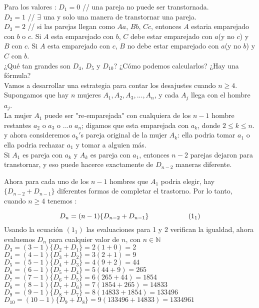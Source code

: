\documentclass[11pt,a4paper]{article}
\begin{document}
Para los valores :\newline
$D_{1} = 0$ \hspace*{0.5cm} // una pareja no puede ser transtornada.\\
$D_{2} = 1$ \hspace*{0.5cm} // $\exists$ una y solo una manera de transtornar una pareja.\\ 
$D_{3} = 2$ \hspace*{0.5cm} // si las parejas llegan como $Aa$, $Bb$, $Cc$, entonces $A$ estaria emparejado con $b$ o $c$. Si $A$ esta emparejado con $b$, $C$ debe estar emparejado con $a$(y no $c$) y $B$ con $c$. Si $A$ esta emparejado con $c$, $B$ no debe estar emparejado con $a$(y no $b$) y $C$ con $b$.\\ \newline
¿Qué tan grandes son $D_{4}$, $D_{5}$ y $D_{10}$? ¿Cómo podemos calcularlos? ¿Hay una fórmula?\\

Vamos a desarrollar una estrategia para contar los desajustes cuando $n \geq 4$. Supongamos que hay $n$ mujeres $A_{1}, A_{2}, A_{3},...,A_{n}$, y cada $A_{j}$ llega con el hombre $a_{j}$.\\

La mujer $A_{1}$ puede ser "re-emparejada" con cualquiera de los $n-1$ hombre restantes $a_{2}$ o $a_{3}$ o ...o $a_{n}$; digamos que esta emparejada con $a_{k}$, donde $2\leq k \leq n.$ y ahora consideremos $a_{k}'$s pareja original de la mujer $A_{k}$: ella podria tomar $a_{1}$ o ella podria rechazar $a_{1}$ y tomar a alguien más.\\

Si $A_{1}$ es pareja con $a_{k}$ y $A_{k}$ es pareja con $a_{1}$, entonces $n-2$ parejas dejaron para transtornar, y eso puede hacerce exactamente de $D_{n-2}$ maneras diferente.

Ahora para cada uno de los $n-1$ hombres que $A_{1}$ podria elegir, hay $\{D_{n-2}+ D_{n-1}\}$ diferentes formas de completar el trastorno. Por lo tanto, cuando $n \geq 4$ tenemos :


$$ D_{n} = (n-1)\{ D_{n-2} + D_{n-1}\} \hspace*{2cm} (1_1) $$ 
Usando la ecuación $(1_1)$ las evaluaciones para 1 y 2 verifican la igualdad, ahora evaluemos $D_{n}$ para cualquier valor de $n$, con $n \in \mathbb{N}$\\ \newline
$D_{3} = (3 - 1)\{D_{2} + D_{1}\} = 2(1 + 0) = 2$\\
$D_{4} = (4 - 1)\{D_{3} + D_{2}\} = 3(2 + 1) = 9$\\
$D_{5} = (5 - 1)\{D_{4} + D_{3}\} = 4(9 + 2) = 44$\\
$D_{6} = (6 - 1)\{D_{5} + D_{4}\} = 5(44 + 9) = 265$\\
$D_{7} = (7 - 1)\{D_{6} + D_{5}\} = 6(265 + 44) = 1854$\\
$D_{8} = (8 - 1)\{D_{7} + D_{6}\} = 7(1854 + 265) = 14833$\\
$D_{9} = (9 - 1)\{D_{8} + D_{7}\} = 8(14833 + 1854) = 133496$\\
$D_{10}= (10 - 1)\{D_{9} + D_{8}\} = 9(133496 + 14833) = 1334961$\\
\end{document}
